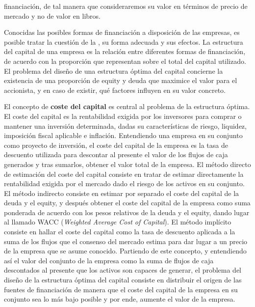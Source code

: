 \documentclass{nuevotema}
\begin{document}
financiación, de tal manera que consideraremos su valor en términos de precio de mercado y no de valor en libros.

Conocidas las posibles formas de financiación a disposición de las empresas, es posible tratar la cuestión de la , su forma adecuada y sus efectos. La estructura del capital de una empresa es la relación entre diferentes formas de financiación, de acuerdo con la proporción que representan sobre el total del capital utilizado. El problema del diseño de una estructura óptima del capital concierne la existencia de una proporción de equity y deuda que maximice el valor para el accionista, y en caso de existir, qué factores influyen en su valor concreto.

El concepto de \textbf{coste del capital} es central al problema de la estructura óptima. El coste del capital es la rentabilidad exigida por los inversores para comprar o mantener una inversión determinada, dadas su características de riesgo, liquidez, imposición fiscal aplicable e inflación. Entendiendo una empresa en su conjunto como proyecto de inversión, el coste del capital de la empresa es la tasa de descuento utilizada para descontar al presente el valor de los flujos de caja generados y tras sumarlos, obtener el valor total de la empresa. El método directo de estimación del coste del capital consiste en tratar de estimar directamente la rentabilidad exigida por el mercado dado el riesgo de los activos en su conjunto. El método indirecto consiste en estimar por separado el coste del capital de la deuda y el equity, y después obtener el coste del capital de la empresa como suma ponderada de acuerdo con los pesos relativos de la deuda y el equity, dando lugar al llamado WACC (\textit{Weighted Average Cost of Capital}). El método implícito consiste en hallar el coste del capital como la tasa de descuento aplicada a la suma de los flujos que el consenso del mercado estima para dar lugar a un precio de la empresa que se asume conocido. Partiendo de este concepto, y entendiendo así el valor del conjunto de la empresa como la suma de flujos de caja descontados al presente que los activos son capaces de generar, el problema del diseño de la estructura óptima del capital consiste en distribuir el origen de las fuentes de financiación de manera que el coste del capital de la empresa en su conjunto sea lo más bajo posible y por ende, aumente el valor de la empresa. 
\end{document}

